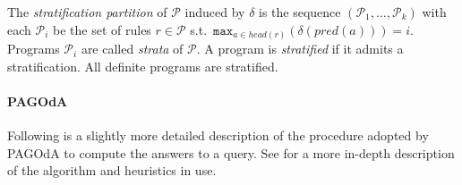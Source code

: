 \documentclass[runningheads]{llncs}
\newcommand{\pagoda}{\mbox{PAGOdA}\xspace}
\begin{document}
The \emph{stratification partition} of $\mathcal{P}$ induced by $\delta$ is the sequence $(\mathcal{P}_1, \dots, \mathcal{P}_k)$ with each $\mathcal{P}_i$ be the set of rules $r \in \mathcal{P}$ s.t.\ $\texttt{max}_{a \in head(r)}(\delta(pred(a))) = i$.
Programs $\mathcal{P}_i$ are called \emph{strata} of $\mathcal{P}$.
A program is \emph{stratified} if it admits a stratification.
All definite programs are stratified.

\paragraph*{\pagoda}

Following is a slightly more detailed description of the procedure adopted by \pagoda to compute the answers to a query.
See \cite{zhou2015} for a more in-depth description of the algorithm and heuristics in use.
\end{document}
